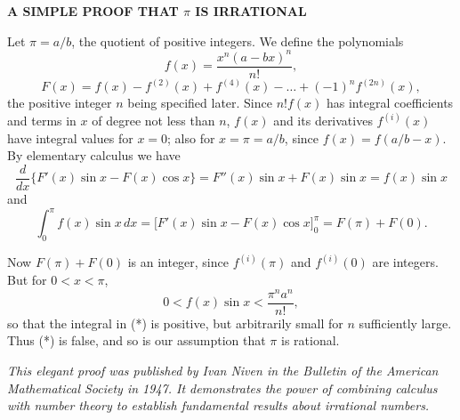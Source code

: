 \begin{remark}
\textbf{A SIMPLE PROOF THAT $\pi$ IS IRRATIONAL}

\medskip

Let $\pi = a/b$, the quotient of positive integers. We define the polynomials
\[
f(x) = \frac{x^n(a - bx)^n}{n!},
\]
\[
F(x) = f(x) - f^{(2)}(x) + f^{(4)}(x) - \dots + (-1)^n f^{(2n)}(x),
\]
the positive integer $n$ being specified later. Since $n!f(x)$ has integral coefficients and terms in $x$ of degree not less than $n$, $f(x)$ and its derivatives $f^{(i)}(x)$ have integral values for $x=0$; also for $x=\pi=a/b$, since $f(x) = f(a/b - x)$. By elementary calculus we have
\[
\frac{d}{dx} \{F'(x) \sin x - F(x) \cos x\} = F''(x) \sin x + F(x) \sin x = f(x) \sin x
\]
and
\begin{equation}
\int_0^\pi f(x) \sin x \, dx = \Big[F'(x) \sin x - F(x) \cos x \Big]_0^\pi = F(\pi) + F(0). \tag{*}
\end{equation}

Now $F(\pi) + F(0)$ is an integer, since $f^{(i)}(\pi)$ and $f^{(i)}(0)$ are integers. But for $0 < x < \pi$,
\[
0 < f(x) \sin x < \frac{\pi^n a^n}{n!},
\]
so that the integral in (*) is positive, but arbitrarily small for $n$ sufficiently large. Thus (*) is false, and so is our assumption that $\pi$ is rational.

\medskip

\textit{This elegant proof was published by Ivan Niven in the Bulletin of the American Mathematical Society in 1947. It demonstrates the power of combining calculus with number theory to establish fundamental results about irrational numbers.}
\end{remark}


